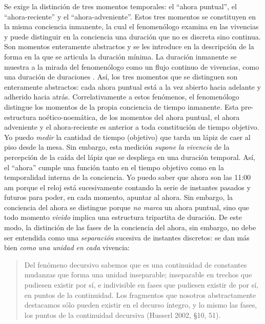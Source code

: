 Se exige la distinción de tres momentos temporales: el ``ahora
puntual'', el ``ahora-reciente'' y el ``ahora-adveniente''. Estos tres
momentos se constituyen en la misma conciencia inmanente, la cual el
fenomenólogo examina en las vivencias y puede distinguir en la
conciencia una duración que no es discreta sino continua. Son momentos
enteramente abstractos y se les introduce en la descripción de la forma
en la que se articula la duración mínima. La duración inmanente se
muestra a la mirada del fenomenólogo como un flujo continuo de
vivencias, como una duración de duraciones \cite[p.~120]{husserl2002}. Así, los
tres momentos que se distinguen son enteramente abstractos: cada ahora
puntual está a la vez abierto hacia adelante y adherido hacia atrás.
Correlativamente a estos fenómenos, el fenomenólogo distingue los
momentos de la propia conciencia de tiempo inmanente. Esta
pre-estructura noético-noemática, de los momentos del ahora puntual, el
ahora adveniente y el ahora-reciente es anterior a toda constitución de
tiempo objetivo. Yo puedo \emph{medir} la cantidad de tiempo (objetivo)
que tarda un lápiz de caer al piso desde la mesa. Sin embargo, esta
medición \emph{supone la vivencia} de la percepción de la caída del
lápiz que se despliega en una duración temporal. Así, el ``ahora''
cumple una función tanto en el tiempo objetivo como en la temporalidad
interna de la conciencia. Yo puedo saber que ahora son las 11:00 am
porque el reloj está sucesivamente contando la serie de instantes
pasados y futuros para poder, en cada momento, apuntar al ahora. Sin
embargo, la conciencia del ahora se distingue porque \emph{no marca} un
ahora puntual, sino que todo momento \emph{vivido} implica una
estructura tripartita de duración. De este modo, la distinción de las
fases de la conciencia del ahora, sin embargo, no debe ser entendida
como una \emph{separación} sucesiva de instantes discretos: se dan más
bien \emph{como una unidad en cada} vivencia:

\begin{quote}
Del fenómeno decursivo sabemos que es una continuidad de constantes
mudanzas que forma una unidad inseparable; inseparable en trechos que
pudiesen existir por sí, e indivisible en fases que pudiesen existir de
por sí, en puntos de la continuidad. Los fragmentos que nosotros
abstractamente destacamos sólo pueden existir en el decurso íntegro, y
lo mismo las fases, los puntos de la continuidad decursiva (Husserl
2002, §10, 51).
\end{quote}

